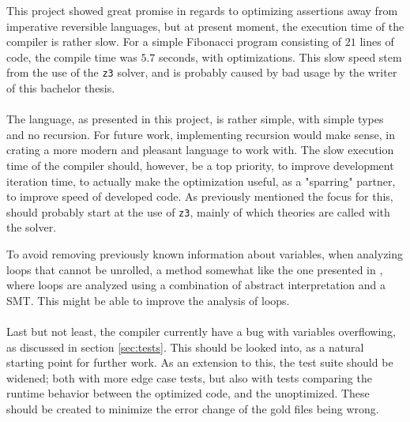 This project showed great promise in regards to optimizing assertions away from imperative
reversible languages, but at present moment, the execution time of the compiler is rather slow.
For a simple Fibonacci program consisting of $21$ lines of code, the compile time was
$5.7$ seconds, with optimizations. This slow speed stem from the use of the \texttt{z3}
solver, and is probably caused by bad usage by the writer of this bachelor thesis.
\\
\\
The \lan language, as presented in this project, is rather simple, with simple types and
no recursion. For future work, implementing recursion would make sense, in crating a more
modern and pleasant language to work with. The slow execution time of the compiler should,
however, be a top priority, to improve development iteration time, to actually make the
optimization useful, as a "sparring" partner, to improve speed of developed code. As previously
mentioned the focus for this, should probably start at the use of \texttt{z3}, mainly of which
theories are called with the solver.

To avoid removing previously known information about variables, when analyzing loops that cannot
be unrolled, a method somewhat like the one presented in \cite{ai}, where loops are analyzed
using a combination of abstract interpretation and a SMT. This might be able to improve the
analysis of loops.
\\
\\
Last but not least, the compiler currently have a bug with variables overflowing, as discussed
in section \ref{sec:tests}. This should be looked into, as a natural starting point for further
work. As an extension to this, the test suite should be widened; both with more edge case tests,
but also with tests comparing the runtime behavior between the optimized code, and the unoptimized.
These should be created to minimize the error change of the gold files being wrong.